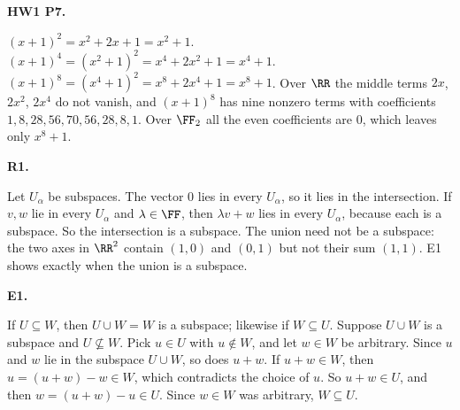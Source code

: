 \documentclass[10pt]{scrartcl}
\begin{document}
\begin{prob}\textbf{HW1 P7.}\par{}
\begin{steps}
  \ii $(x+1)^2=x^2+2x+1=x^2+1$.
  \ii $(x+1)^4=(x^2+1)^2=x^4+2x^2+1=x^4+1$.
  \ii $(x+1)^8=(x^4+1)^2=x^8+2x^4+1=x^8+1$.
  \ii Over $\RR$ the middle terms $2x$, $2x^2$, $2x^4$ do not vanish, and $(x+1)^8$ has nine nonzero terms with coefficients $1,8,28,56,70,56,28,8,1$. Over $\FF_2$ all the even coefficients are $0$, which leaves only $x^8+1$.
\end{steps}
\end{prob}

\begin{prob}\textbf{R1.}\par{}
\begin{steps}
  \ii Let $U_\alpha$ be subspaces. The vector $0$ lies in every $U_\alpha$, so it lies in the intersection. If $v,w$ lie in every $U_\alpha$ and $\lambda\in\FF$, then $\lambda v+w$ lies in every $U_\alpha$, because each is a subspace. So the intersection is a subspace.
  \ii The union need not be a subspace: the two axes in $\RR^2$ contain $(1,0)$ and $(0,1)$ but not their sum $(1,1)$. E1 shows exactly when the union is a subspace.
\end{steps}
\end{prob}

\begin{prob}\textbf{E1.}\par{}
\begin{steps}
  \ii If $U\subseteq W$, then $U\cup W=W$ is a subspace; likewise if $W\subseteq U$.
  \ii Suppose $U\cup W$ is a subspace and $U\not\subseteq W$. Pick $u\in U$ with $u\notin W$, and let $w\in W$ be arbitrary. Since $u$ and $w$ lie in the subspace $U\cup W$, so does $u+w$.
  \ii If $u+w\in W$, then $u=(u+w)-w\in W$, which contradicts the choice of $u$. So $u+w\in U$, and then $w=(u+w)-u\in U$. Since $w\in W$ was arbitrary, $W\subseteq U$.
\end{steps}
\end{prob}
\end{document}

